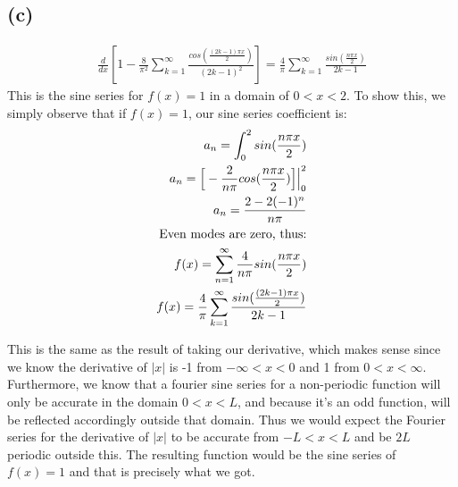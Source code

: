 \documentclass{article}
\begin{document}
\subsection*{\textbf{(c)}}
\begin{equation}
\begin{aligned}
\frac{d}{dx}[1 - \frac{8}{\pi^2}\sum_{k=1}^{\infty}\frac{cos(\frac{(2k-1)\pi x}{2})}{(2k-1)^2}] = \frac{4}{\pi}\sum_{k=1}^{\infty}\frac{sin(\frac{n\pi x}{2})}{2k-1}
\end{aligned}
\end{equation}
This is the sine series for $f(x) =1$ in a domain of $0<x<2$. To show this, we simply observe that if $f(x) = 1$, our sine series coefficient is:
\begin{equation}
 \begin{aligned}
 a_n = \int_0^2 sin(\frac{n\pi x}{2})\\
 a_n = \Big{[}-\frac{2}{n\pi}cos(\frac{n\pi x}{2}) \Big{]}\Big{|}_0^2\\
 a_n = \frac{2 - 2(-1)^n}{n\pi}\\
 \text{Even modes are zero, thus:}\\
 f(x) = \sum_{n=1}^{\infty}\frac{4}{n\pi}sin(\frac{n\pi x}{2})\\
 f(x) = \frac{4}{\pi}\sum_{k=1}^{\infty}\frac{sin(\frac{(2k-1)\pi x}{2})}{2k-1}
 \end{aligned}
 \end{equation} 

This is the same as the result of taking our derivative, which makes sense since we know the derivative of $|x|$ is -1 from $-\infty < x < 0$ and 1 from $0<x<\infty$. Furthermore, we know that a fourier sine series for a non-periodic function will only be accurate in the domain $0 < x< L$, and because it's an odd function, will be reflected accordingly outside that domain. Thus we would expect the Fourier series for the derivative of $|x|$ to be accurate from $-L < x < L$ and be $2L$ periodic outside this. The resulting function would be the sine series of $f(x) = 1$ and that is precisely what we got.
\end{document}

